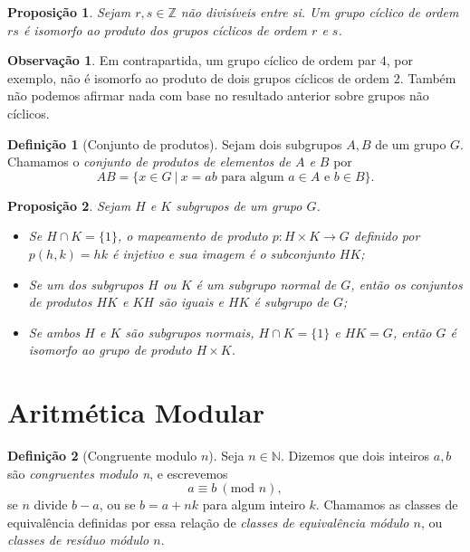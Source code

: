 \documentclass[a4paper,12pt]{report}
\theoremstyle{plain}
\newtheorem{proposicao}{Proposição}[section]
\theoremstyle{definition}
\newtheorem{definicao}{Definição}[section]
\newtheorem{observacao}{Observação}[section]
\begin{document}
\begin{proposicao}
	Sejam \(r,s\in\mathbb{Z}\) não divisíveis entre si.
	Um grupo cíclico de ordem \(rs\) é isomorfo ao produto dos grupos
	cíclicos de ordem \(r\) e \(s\).	
\end{proposicao}

\begin{observacao}
	Em contrapartida, um grupo cíclico de ordem par \(4\), por exemplo, não
	é isomorfo ao produto de dois grupos cíclicos de ordem \(2\). Também não
	podemos afirmar nada com base no resultado anterior sobre grupos não
	cíclicos.
\end{observacao}

\begin{definicao}[Conjunto de produtos]
	Sejam dois subgrupos \(A,B\) de um grupo \(G\).
	Chamamos o \emph{conjunto de produtos de elementos de \(A\) e \(B\)} por
	\[AB = \{x\in G \ | \ x = ab \text{ para algum }a\in A\text{ e }b\in B\}.\]
\end{definicao}

\begin{proposicao}
	Sejam \(H\) e \(K\) subgrupos de um grupo \(G\).
	\begin{itemize}
		\item Se \(H\cap K = \{1\}\), o mapeamento de produto
		\(p: H\times K\longrightarrow G\) definido por \(p(h,k) = hk\) é
		injetivo e sua imagem é o subconjunto \(HK\);
		\item Se um dos subgrupos
		\(H\) ou \(K\) é um subgrupo normal de \(G\), então os conjuntos de
		produtos \(HK\) e \(KH\) são iguais e \(HK\) é subgrupo de \(G\);
		\item Se ambos \(H\) e \(K\) são subgrupos normais, \(H\cap K = \{1\}\) e
		\(HK = G\), então \(G\) é isomorfo ao grupo de produto \(H\times K\).
	\end{itemize}
\end{proposicao}

\section{Aritmética Modular}

\begin{definicao}[Congruente modulo $n$]
	Seja \(n\in\mathbb{N}\). Dizemos que dois inteiros
	\(a,b\) são \emph{congruentes modulo n}, e escrevemos
	\[ a \equiv b \ (\text{mod }n),\]
	se \(n\) divide \(b-a\), ou se \(b = a + nk\) para algum inteiro \(k\).
	Chamamos as classes de equivalência definidas por essa relação de
	\emph{classes de equivalência módulo \(n\)}, ou \emph{classes de resíduo módulo \(n\)}.	
\end{definicao}
\end{document}
